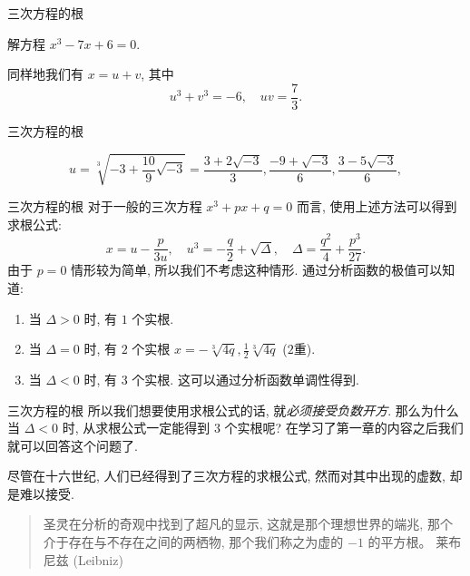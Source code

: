 \begin{frame}{三次方程的根}
\onslide<+->
\begin{example}
解方程 $x^3-7x+6=0$.
\end{example}
\onslide<+->
\begin{solution}
\indent 同样地我们有 $x=u+v$, 其中
	\[u^3+v^3=-6,\quad uv=\frac73.\]

\end{solution}
\end{frame}


\begin{frame}{三次方程的根}
\onslide<+->
\begin{solutionc}
	\[u=\sqrt[3]{-3+\frac{10}9\sqrt{-3}}
	=\frac{3+2\sqrt{-3}}3,\frac{-9+\sqrt{-3}}6,\frac{3-5\sqrt{-3}}6,\]
\visible<+->{相应地
	\[v=\frac{3-2\sqrt{-3}}3,\frac{-9-\sqrt{-3}}6,\frac{3+5\sqrt{-3}}6,\]}
\visible<+->{\[x=u+v=2,-3,1.\]}
\end{solutionc}
\end{frame}


\begin{frame}{三次方程的根}
\onslide<+->对于一般的三次方程 $x^3+px+q=0$ 而言, 使用上述方法可以得到求根公式:
\[x=u-\frac p{3u},\quad u^3=-\frac q2+\sqrt{\Delta},\quad \Delta=\frac{q^2}4+\frac{p^3}{27}.\]
\onslide<+->由于 $p=0$ 情形较为简单, 所以我们不考虑这种情形.
\onslide<+->通过分析函数的极值可以知道:
\begin{enumerate}
\item 当 $\Delta>0$ 时, 有 $1$ 个实根.
\item 当 $\Delta=0$ 时, 有 $2$ 个实根 $x=-\sqrt[3]{4q},\frac12\sqrt[3]{4q}$ ($2$重).
\item 当 $\Delta<0$ 时, 有 $3$ 个实根. 这可以通过分析函数单调性得到.
\end{enumerate}
\end{frame}


\begin{frame}{三次方程的根}
\onslide<+->所以我们想要使用求根公式的话, 就\emph{必须接受负数开方}.
\onslide<+->那么为什么当 $\Delta<0$ 时, 从求根公式一定能得到 $3$ 个实根呢?
\onslide<+->在学习了第一章的内容之后我们就可以回答这个问题了.

\onslide<+->尽管在十六世纪, 人们已经得到了三次方程的求根公式, 然而对其中出现的虚数, 却是难以接受.
\onslide<+->
\begin{quote}
\indent 圣灵在分析的奇观中找到了超凡的显示, 这就是那个理想世界的端兆, 那个介于存在与不存在之间的两栖物, 那个我们称之为虚的 $-1$ 的平方根。
\tcblower
莱布尼兹 (Leibniz)
\end{quote}
\end{frame}


